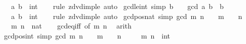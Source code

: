 \begin{isabellebody}
\ \ \ a\ b\ {\isacharcolon}{\kern0pt}{\isacharcolon}{\kern0pt}\ int\isanewline
%
\isadelimproof
\ \ %
\endisadelimproof
%
\isatagproof
{}\isamarkupfalse%
\ {\isacharparenleft}{\kern0pt}rule\ zdvd{\isacharunderscore}{\kern0pt}imp{\isacharunderscore}{\kern0pt}le{\isacharparenright}{\kern0pt}\ auto%
\endisatagproof
{\isafoldproof}%
%
\isadelimproof
\isanewline
%
\endisadelimproof
\isanewline
{}\isamarkupfalse%
\ gcd{\isacharunderscore}{\kern0pt}le{}{\isacharunderscore}{\kern0pt}int\ {\isacharbrackleft}{\kern0pt}simp{\isacharbrackright}{\kern0pt}{\isacharcolon}{\kern0pt}\ {\isachardoublequoteopen}b\ {\isachargreater}{\kern0pt}\ {}\ {\isasymLongrightarrow}\ gcd\ a\ b\ {\isasymle}\ b{\isachardoublequoteclose}\isanewline
\ \ \ a\ b\ {\isacharcolon}{\kern0pt}{\isacharcolon}{\kern0pt}\ int\isanewline
%
\isadelimproof
\ \ %
\endisadelimproof
%
\isatagproof
{}\isamarkupfalse%
\ {\isacharparenleft}{\kern0pt}rule\ zdvd{\isacharunderscore}{\kern0pt}imp{\isacharunderscore}{\kern0pt}le{\isacharparenright}{\kern0pt}\ auto%
\endisatagproof
{\isafoldproof}%
%
\isadelimproof
\isanewline
%
\endisadelimproof
\isanewline
{}\isamarkupfalse%
\ gcd{\isacharunderscore}{\kern0pt}pos{\isacharunderscore}{\kern0pt}nat\ {\isacharbrackleft}{\kern0pt}simp{\isacharbrackright}{\kern0pt}{\isacharcolon}{\kern0pt}\ {\isachardoublequoteopen}gcd\ m\ n\ {\isachargreater}{\kern0pt}\ {}\ {\isasymlongleftrightarrow}\ m\ {\isasymnoteq}\ {}\ {\isasymor}\ n\ {\isasymnoteq}\ {}{\isachardoublequoteclose}\isanewline
\ \ \ m\ n\ {\isacharcolon}{\kern0pt}{\isacharcolon}{\kern0pt}\ nat\isanewline
%
\isadelimproof
\ \ %
\endisadelimproof
%
\isatagproof
{}\isamarkupfalse%
\ gcd{\isacharunderscore}{\kern0pt}eq{\isacharunderscore}{\kern0pt}{}{\isacharunderscore}{\kern0pt}iff\ {\isacharbrackleft}{\kern0pt}of\ m\ n{\isacharbrackright}{\kern0pt}\ \isamarkupfalse%
\ arith%
\endisatagproof
{\isafoldproof}%
%
\isadelimproof
\isanewline
%
\endisadelimproof
\isanewline
{}\isamarkupfalse%
\ gcd{\isacharunderscore}{\kern0pt}pos{\isacharunderscore}{\kern0pt}int\ {\isacharbrackleft}{\kern0pt}simp{\isacharbrackright}{\kern0pt}{\isacharcolon}{\kern0pt}\ {\isachardoublequoteopen}gcd\ m\ n\ {\isachargreater}{\kern0pt}\ {}\ {\isasymlongleftrightarrow}\ m\ {\isasymnoteq}\ {}\ {\isasymor}\ n\ {\isasymnoteq}\ {}{\isachardoublequoteclose}\isanewline
\ \ \ m\ n\ {\isacharcolon}{\kern0pt}{\isacharcolon}{\kern0pt}\ int\isanewline

\end{isabellebody}

